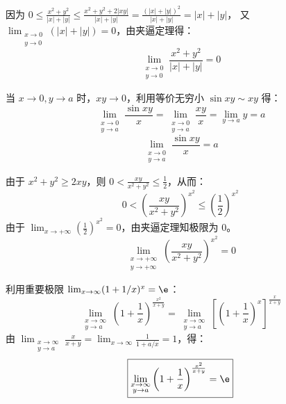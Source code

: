 \begin{solution}
    因为 $0 \le \frac{x^2 + y^2}{|x| + |y|} \le \frac{x^2 + y^2 + 2|xy|}{|x| + |y|} = \frac{(|x| + |y|)^2}{|x| + |y|} = |x| + |y|$，
    又 $\lim_{\substack{x \to 0 \\ y \to 0}} (|x| + |y|) = 0$，由夹逼定理得：
    \begin{equation*}
        \boxed{\lim_{\substack{x \to 0 \\ y \to 0}} \frac{x^2 + y^2}{|x| + |y|} = 0}
    \end{equation*}

    当 $x \to 0, y \to a$ 时，$xy \to 0$，利用等价无穷小 $\sin xy \sim xy$ 得：
    \begin{equation*}
        \lim_{\substack{x \to 0 \\ y \to a}} \frac{\sin xy}{x} = \lim_{\substack{x \to 0 \\ y \to a}} \frac{xy}{x} = \lim_{y \to a} y = a
    \end{equation*}
    \begin{equation*}
        \boxed{\lim_{\substack{x \to 0 \\ y \to a}} \frac{\sin xy}{x} = a}
    \end{equation*}

    由于 $x^2 + y^2 \ge 2xy$，则 $0 < \frac{xy}{x^2 + y^2} \le \frac{1}{2}$，从而：
    \begin{equation*}
        0 < \left( \frac{xy}{x^2 + y^2} \right)^{x^2} \le \left( \frac{1}{2} \right)^{x^2}
    \end{equation*}
    由于 $\lim_{x \to +\infty} \left( \frac{1}{2} \right)^{x^2} = 0$，由夹逼定理知极限为 $0$。
    \begin{equation*}
        \boxed{\lim_{\substack{x \to +\infty \\ y \to +\infty}} \left( \frac{xy}{x^2 + y^2} \right)^{x^2} = 0}
    \end{equation*}

    利用重要极限 $\lim_{x \to \infty} (1 + 1/x)^x = \e$：
    \begin{equation*}
        \lim_{\substack{x \to \infty \\ y \to a}} \left( 1 + \frac{1}{x} \right)^{\frac{x^2}{x+y}} = \lim_{\substack{x \to \infty \\ y \to a}} \left[ \left( 1 + \frac{1}{x} \right)^x \right]^{\frac{x}{x+y}}
    \end{equation*}
    由 $\lim_{\substack{x \to \infty \\ y \to a}} \frac{x}{x+y} = \lim_{x \to \infty} \frac{1}{1 + a/x} = 1$，得：
    \begin{equation*}
        \boxed{\lim_{\substack{x \to \infty \\ y \to a}} \left( 1 + \frac{1}{x} \right)^{\frac{x^2}{x+y}} = \e}
    \end{equation*}


\end{solution}
